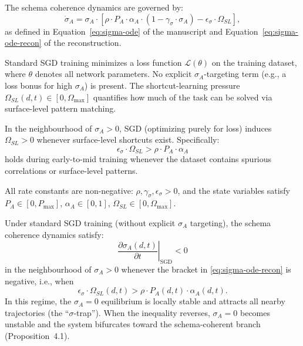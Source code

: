 
\begin{definition}
The schema coherence dynamics are governed by:
\[
\dot{\sigma}_A = \sigma_A \cdot
[\rho \cdot P_A \cdot \alpha_A \cdot (1 - \gamma_\sigma \cdot \sigma_A)
- \epsilon_\sigma \cdot \Omega_{SL}],
\]
as defined in Equation~\eqref{eq:sigma-ode} of the manuscript
and Equation~\eqref{eq:sigma-ode-recon} of the reconstruction.
\end{definition}

\begin{definition}
Standard SGD training minimizes a loss function $\mathcal{L}(\theta)$
on the training dataset, where $\theta$ denotes all network parameters.
No explicit $\sigma_A$-targeting term (e.g., a loss bonus for high
$\sigma_A$) is present. The shortcut-learning pressure
$\Omega_{SL}(d,t) \in [0, \Omega_{\max}]$ quantifies how much of the
task can be solved via surface-level pattern matching.
\end{definition}

\begin{assumption}
In the neighbourhood of $\sigma_A > 0$, SGD (optimizing purely for loss)
induces $\Omega_{SL} > 0$ whenever surface-level shortcuts exist.
Specifically:
\[
\epsilon_\sigma \cdot \Omega_{SL} > \rho \cdot P_A \cdot \alpha_A
\]
holds during early-to-mid training whenever the dataset contains
spurious correlations or surface-level patterns.
\end{assumption}

\begin{assumption}
All rate constants are non-negative: $\rho, \gamma_\sigma, \epsilon_\sigma > 0$,
and the state variables satisfy $P_A \in [0, P_{\max}]$,
$\alpha_A \in [0, 1]$, $\Omega_{SL} \in [0, \Omega_{\max}]$.
\end{assumption}

\begin{theorem}
\label{thm:suppression}
Under standard SGD training (without explicit $\sigma_A$ targeting),
the schema coherence dynamics satisfy:
\[
\left.\frac{\partial \sigma_A(d,t)}{\partial t}\right|_{\text{SGD}} < 0
\]
in the neighbourhood of $\sigma_A > 0$ whenever the bracket in
\eqref{eq:sigma-ode-recon} is negative, i.e., when
\[
\epsilon_\sigma \cdot \Omega_{SL}(d,t) > \rho \cdot P_A(d,t) \cdot \alpha_A(d,t).
\]
In this regime, the $\sigma_A = 0$ equilibrium is locally stable and
attracts all nearby trajectories (the ``$\sigma$-trap''). When the
inequality reverses, $\sigma_A = 0$ becomes unstable and the system
bifurcates toward the schema-coherent branch (Proposition~4.1).
\end{theorem}

